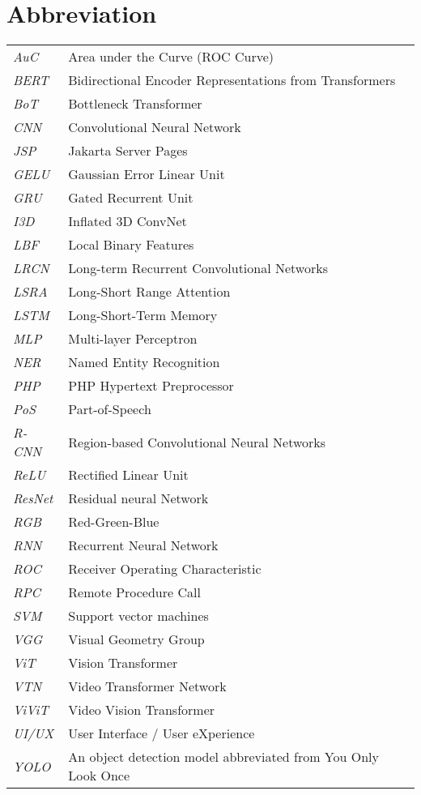 \newpage
\makeatletter
\let\mcnewpage=\newpage
\newcommand{\TrickSupertabularIntoMulticols}{%
  \renewcommand\newpage{%
    \if@firstcolumn
      \hrule width\linewidth height0pt
      \columnbreak
    \else
      \mcnewpage
    \fi
  }%
}
\makeatother
\chapter{Abbreviation}
\begin{changemargin}{-0.5cm}{0cm}
\begin{multicols*}{2}
\TrickSupertabularIntoMulticols
\begin{supertabular}{>{\em}lp{6.2cm}}
AuC & Area under the Curve (ROC Curve) \\ [.5em]
BERT & Bidirectional Encoder Representations from Transformers \\ [.5em]
BoT & Bottleneck Transformer \\ [.5em]
CNN & Convolutional Neural Network \\ [.5em]
JSP & Jakarta Server Pages \\ [.5em]
GELU & Gaussian Error Linear Unit \\ [.5em]
GRU & Gated Recurrent Unit \\ [.5em]
I3D & Inflated 3D ConvNet \\ [.5em]
LBF & Local Binary Features \\ [.5em]
LRCN & Long-term Recurrent Convolutional Networks \\ [.5em]
LSRA & Long-Short Range Attention \\ [.5em]
LSTM & Long-Short-Term Memory \\ [.5em]
MLP & Multi-layer Perceptron \\ [.5em]
NER & Named Entity Recognition \\ [.5em]
PHP & PHP Hypertext Preprocessor \\ [.5em]
PoS & Part-of-Speech \\ [.5em]
R-CNN & Region-based Convolutional Neural Networks \\ [.5em]
ReLU & Rectified Linear Unit \\ [.5em]
ResNet & Residual neural Network \\ [.5em]
RGB & Red-Green-Blue \\ [.5em]
RNN & Recurrent Neural Network \\ [.5em]
ROC & Receiver Operating Characteristic \\ [.5em]
RPC & Remote Procedure Call \\ [.5em]
SVM & Support vector machines \\ [.5em]
VGG & Visual Geometry Group \\ [.5em]
ViT & Vision Transformer \\ [.5em]
VTN & Video Transformer Network \\ [.5em]
ViViT & Video Vision Transformer \\ [.5em]
UI/UX & User Interface / User eXperience \\ [.5em]
YOLO & An object detection model abbreviated from You Only Look Once \\ [.5em]
\end{supertabular}
\end{multicols*}
\end{changemargin}